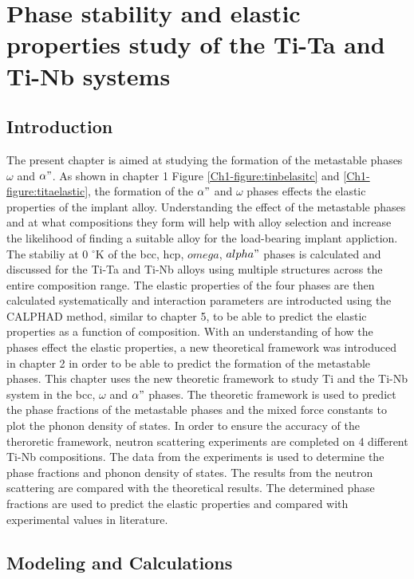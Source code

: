 \chapter{Phase stability and elastic properties study of the Ti-Ta and Ti-Nb systems}

\section{Introduction}

The present chapter is aimed at studying the formation of the metastable phases $\omega$ and $\alpha"$. As shown in chapter 1 Figure \ref{Ch1-figure:tinbelasitc} and \ref{Ch1-figure:titaelastic}, the formation of the $\alpha"$ and $\omega$ phases effects the elastic properties of the implant alloy. Understanding the effect of the metastable phases and at what compositions they form will help with alloy selection and increase the likelihood of finding a suitable alloy for the load-bearing implant appliction. The stabiliy at 0 $^\circ$K of the bcc, hcp, $omega$, $alpha"$ phases is calculated and discussed for the Ti-Ta and Ti-Nb alloys using multiple structures across the entire composition range. The elastic properties of the four phases are then calculated systematically and interaction parameters are introducted using the CALPHAD method, similar to chapter 5, to be able to predict the elastic properties as a function of composition. With an understanding of how the phases effect the elastic properties, a new theoretical framework was introduced in chapter 2 in order to be able to predict the formation of the metastable phases. This chapter uses the new theoretic framework to study Ti and the Ti-Nb system in the bcc, $\omega$ and $\alpha"$ phases. The theoretic framework is used to predict the phase fractions of the metastable phases and the mixed force constants to plot the phonon density of states. In order to ensure the accuracy of the theroretic framework, neutron scattering experiments are completed on 4 different Ti-Nb compositions. The data from the experiments is used to determine the phase fractions and phonon density of states. The results from the neutron scattering are compared with the theoretical results. The determined phase fractions are used to predict the elastic properties and compared with experimental values in literature.

\section{Modeling and Calculations}

